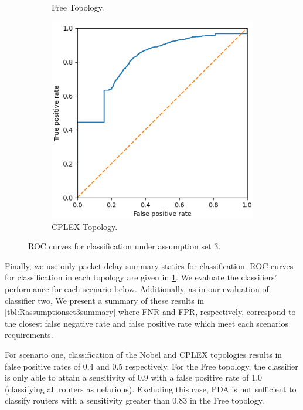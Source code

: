 \begin{figure}
\begin{subfigure}{0.475\textwidth}
        \caption{Free Topology.}
    \end{subfigure}
    \begin{subfigure}{0.475\textwidth}
        \includegraphics[width=\textwidth]{figs/results/norway_case3_roc.png}
        \caption{CPLEX Topology.}
    \end{subfigure}
    \caption{ROC curves for classification under assumption set 3.}
    \label{fig:RA3ROCcurves}
\end{figure}
Finally, we use only packet delay summary statics for classification. ROC curves for classification in each topology are given in \cref{fig:RA3ROCcurves}. We evaluate the classifiers' performance for each scenario below. Additionally, as in our evaluation of classifier two, We present a summary of these results in \cref{tbl:Rassumptionset3summary} where FNR and FPR, respectively, correspond to the closest false negative rate and false positive rate which meet each scenarios requirements.\par\par
For scenario one, classification of the Nobel and CPLEX topologies results in false positive rates of 0.4 and 0.5 respectively. For the Free topology, the classifier is only able to attain a sensitivity of 0.9 with a false positive rate of 1.0 (classifying all routers as nefarious). Excluding this case, PDA is not sufficient to classify routers with a sensitivity greater than 0.83 in the Free topology.\par
